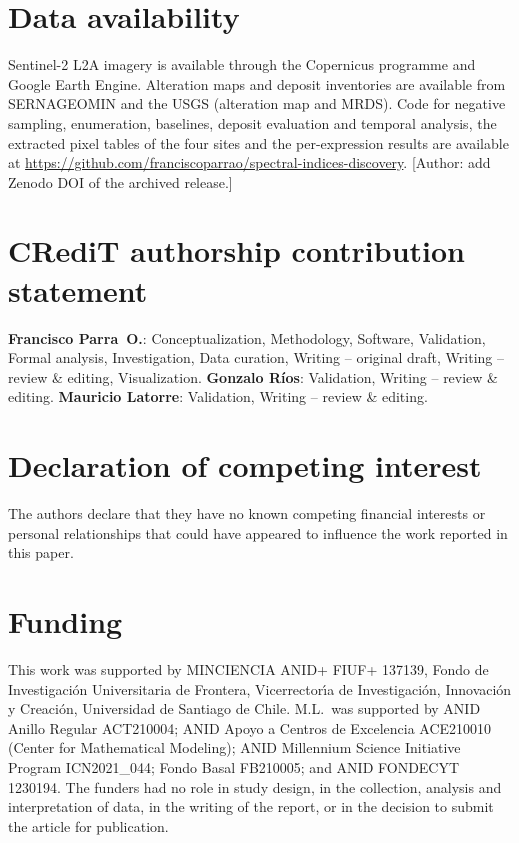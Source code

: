 \documentclass[preprint,authoryear,number]{elsarticle}
\begin{document}
\section*{Data availability}

Sentinel-2 L2A imagery is available through the Copernicus programme and Google Earth Engine. Alteration maps and deposit inventories are available from SERNAGEOMIN and the USGS (alteration map and MRDS). Code for negative sampling, enumeration, baselines, deposit evaluation and temporal analysis, the extracted pixel tables of the four sites and the per-expression results are available at \url{https://github.com/franciscoparrao/spectral-indices-discovery}. [Author: add Zenodo DOI of the archived release.]

\section*{CRediT authorship contribution statement}

\textbf{Francisco Parra~O.}: Conceptualization, Methodology, Software, Validation, Formal analysis, Investigation, Data curation, Writing -- original draft, Writing -- review \& editing, Visualization.
\textbf{Gonzalo R\'ios}: Validation, Writing -- review \& editing.
\textbf{Mauricio Latorre}: Validation, Writing -- review \& editing.

\section*{Declaration of competing interest}

The authors declare that they have no known competing financial interests or personal relationships that could have appeared to influence the work reported in this paper.

\section*{Funding}

This work was supported by MINCIENCIA ANID+ FIUF+ 137139, Fondo de Investigaci\'on Universitaria de Frontera, Vicerrector\'\i a de Investigaci\'on, Innovaci\'on y Creaci\'on, Universidad de Santiago de Chile. M.L.\ was supported by ANID Anillo Regular ACT210004; ANID Apoyo a Centros de Excelencia ACE210010 (Center for Mathematical Modeling); ANID Millennium Science Initiative Program ICN2021\_044; Fondo Basal FB210005; and ANID FONDECYT 1230194. The funders had no role in study design, in the collection, analysis and interpretation of data, in the writing of the report, or in the decision to submit the article for publication.
\end{document}
